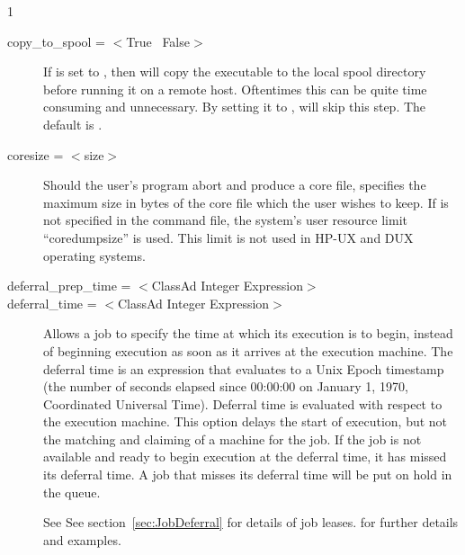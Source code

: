 \begin{ManPage}{\label{man-condor-submit}}{1}
\begin{description}
\item[copy\_to\_spool = $<$True \Bar\ False$>$] If  is set to
, then  will copy the executable to the local spool 
directory before running it on a remote host. Oftentimes this can be quite
time consuming and unnecessary. By setting it to , 
will skip this step. The default is .


\item[coresize = $<$size$>$] Should the user's program abort and produce
a core file,  specifies the maximum size in bytes of the
core file which the user wishes to keep. If  is not
specified in the command file, the system's user resource limit
\mbox{``coredumpsize''} is used.
This limit is not used in HP-UX and DUX operating systems. 



\item[deferral\_prep\_time = $<$ClassAd Integer Expression$>$]
\Todo


\item[deferral\_time = $<$ClassAd Integer Expression$>$]
Allows a job to specify the time at which its execution
is to begin,
instead of beginning execution as soon as it arrives at the execution
machine. The deferral time is an expression that 
evaluates to a Unix Epoch timestamp (the number of
seconds elapsed since 00:00:00 on January 1, 1970, Coordinated
Universal Time). 
Deferral time is evaluated with respect to the execution machine.
This option delays the start of
execution, but not the matching and claiming of
a machine for the job.
If the job is not available and ready to begin
execution at the deferral time, it has missed its deferral time.
A job that misses its deferral time will be put on hold
in the queue. 

See
See section~\ref{sec:JobDeferral} for details of job leases.
for further details and examples.


\end{description}
\end{ManPage}
